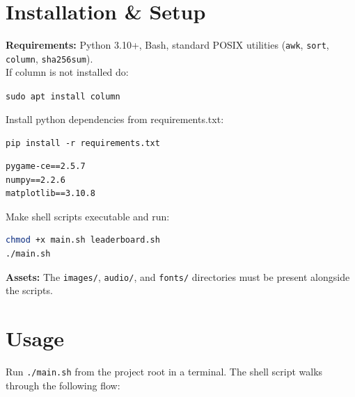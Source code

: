 \documentclass[12pt]{article}
\begin{document}
\section{Installation \& Setup}

\textbf{Requirements:} Python 3.10+, Bash, standard POSIX utilities (\texttt{awk}, \texttt{sort}, \texttt{column}, \texttt{sha256sum}).\\
If column is not installed do:

\texttt{sudo apt install column}

Install python dependencies from requirements.txt:

\texttt{pip install -r requirements.txt}

\begin{lstlisting}
pygame-ce==2.5.7
numpy==2.2.6
matplotlib==3.10.8
\end{lstlisting}

Make shell scripts executable and run:

\begin{lstlisting}[language=bash]
chmod +x main.sh leaderboard.sh
./main.sh
\end{lstlisting}

\textbf{Assets:} The \texttt{images/}, \texttt{audio/}, and \texttt{fonts/} directories must be present alongside the scripts.
\newpage
\section{Usage}

Run \texttt{./main.sh} from the project root in a terminal. The shell script walks through the following flow:
\end{document}

